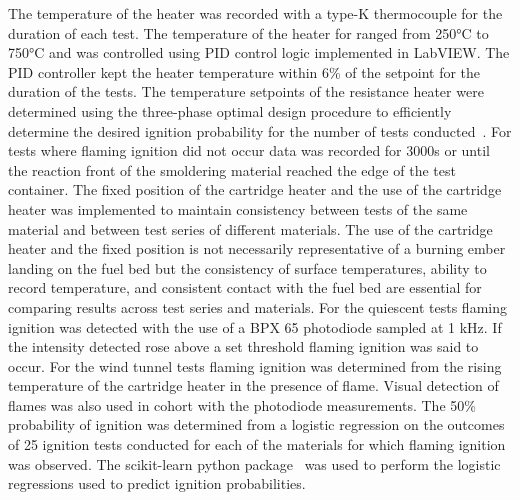     The temperature of the heater was recorded with a type-K thermocouple for the duration of each test. The temperature of the heater for ranged from 250\si{\celsius} to 750\si{\celsius} and was controlled using PID control logic implemented in LabVIEW. The PID controller kept the heater temperature within 6\% of the setpoint for the duration of the tests. The temperature setpoints of the resistance heater were determined using the three-phase optimal design procedure to efficiently determine the desired ignition probability for the number of tests conducted~\cite{Wu2014}. For tests where flaming ignition did not occur data was recorded for 3000\si{\second} or until the reaction front of the smoldering material reached the edge of the test container. The fixed position of the cartridge heater and the use of the cartridge heater was implemented to maintain consistency between tests of the same material and between test series of different materials. The use of the cartridge heater and the fixed position is not necessarily representative of a burning ember landing on the fuel bed but the consistency of surface temperatures, ability to record temperature, and consistent contact with the fuel bed are essential for comparing results across test series and materials. For the quiescent tests flaming ignition was detected with the use of a BPX 65 photodiode sampled at 1 kHz. If the intensity detected rose above a set threshold flaming ignition was said to occur. For the wind tunnel tests flaming ignition was determined from the rising temperature of the cartridge heater in the presence of flame. Visual detection of flames was also used in cohort with the photodiode measurements. The 50\% probability of ignition was determined from a logistic regression on the outcomes of 25 ignition tests conducted for each of the materials for which flaming ignition was observed. The scikit-learn python package~\cite{scikit-learn} was used to perform the logistic regressions used to predict ignition probabilities.
